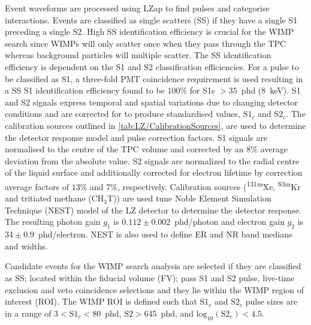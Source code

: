 Event waveforms are processed using LZap to find pulses and categorise interactions. Events are classified as single scatters (SS) if they have a single S1 preceding a single S2. High SS identification efficiency is crucial for the WIMP search since WIMPs will only scatter once when they pass through the TPC whereas background particles will multiple scatter. The SS identification efficiency is dependent on the S1 and S2 classification efficiencies. For a pulse to be classified as S1, a three-fold PMT coincidence requirement is used resulting in a SS S1 identification efficiency found to be $100\%$ for S1s $>35$~phd (8~keV). S1 and S2 signals express temporal and spatial variations due to changing detector conditions and are corrected for to produce standardised values, $\text{S1}_c$ and $\text{S2}_c$. The calibration sources outlined in \autoref{tab:LZ/CalibrationSources}, are used to determine the detector response model and pulse correction factors. S1 signals are normalised to the centre of the TPC volume and corrected by an $8\%$ average deviation from the absolute value. S2 signals are normalized to the radial centre of the liquid surface and additionally corrected for electron lifetime by correction average factors of $13\%$ and $7\%$, respectively.
Calibration sources (\textsuperscript{131m}Xe, \textsuperscript{83m}Kr and tritiated methane ($\text{CH}_3\text{T}$)) are used tune Noble Element Simulation Technique (NEST) model of the LZ detector to determine the detector response. The resulting photon gain $g_1$ is $0.112\pm0.002$~phd/photon and electron gain $g_2$ is $34\pm0.9$~phd/electron. NEST is also used to define ER and NR band medians and widths.

Candidate events for the WIMP search analysis are selected if they are classified as SS; located within the fiducial volume (FV); pass S1 and S2 pulse, live-time exclusion and veto coincidence selections and they lie within the WIMP region of interest (ROI). The WIMP ROI is defined such that $\text{S1}_c$ and $\text{S2}_c$ pulse sizes are in a range of $3<\text{S1}_c<80$~phd, $\text{S2}>645$~phd, and $\text{log}_\text{10}(\text{S2}_c)<4.5$. 

